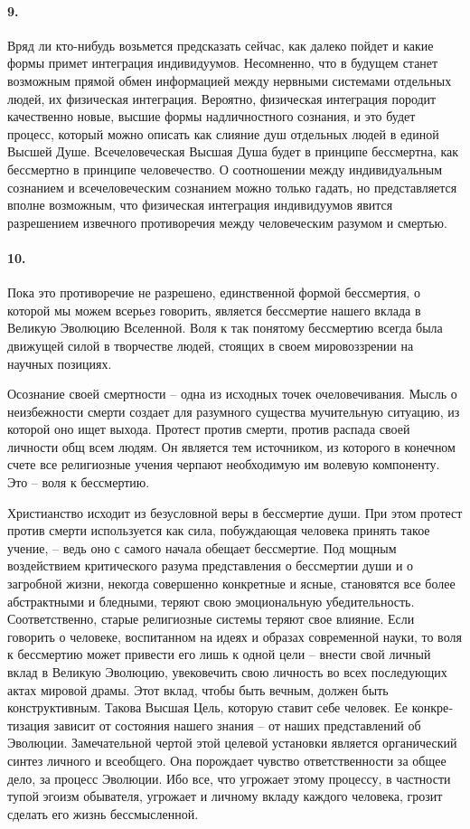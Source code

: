 \documentclass{book}
\begin{document}
\paragraph{9.} Вряд ли кто-нибудь возьмется предсказать сейчас, как далеко пойдет и какие формы примет интеграция индивидуумов. Несомненно, что в будущем станет возможным прямой обмен информацией между нервными системами отдельных людей, их физическая интеграция. Вероятно, физическая интеграция породит качественно новые, высшие формы надличностного сознания, и это будет процесс, который можно опи­сать как слияние душ отдельных людей в единой Высшей Душе. Всечеловеческая Высшая Душа будет в принципе бессмертна, как бессмертно в принципе человечество. О соотношении между индивидуальным сознанием и всечеловеческим сознанием можно только гадать, но представляется вполне возможным, что физическая интеграция индивидуумов явится разрешением извечного противоречия между человеческим разумом и смертью.

\paragraph{10.} Пока это противоречие не разрешено, единственной формой бессмертия, о которой мы можем всерьез говорить, является бессмертие нашего вклада в Великую Эволюцию Вселенной. Воля к так понятому бессмертию всегда была движущей силой в творчестве людей, стоящих в своем мировоззрении на научных позициях.

Осознание своей смертности -- одна из исходных точек очеловечивания. Мысль о неизбежности смерти создает для разумного существа мучительную ситуацию, из которой оно ищет выхода. Протест против смерти, против распада своей личности общ всем людям. Он является тем источником, из которого в конечном счете все религиозные учения черпают необходимую им волевую компоненту. Это -- воля к бессмертию.

Христианство исходит из безусловной веры в бессмертие души. При этом протест против смерти используется как сила, побуждающая человека принять такое учение, -- ведь оно с самого начала обещает бессмертие. Под мощным воздействием критического разума представления о бессмертии души и о загробной жизни, некогда совершенно конкретные и ясные, становятся все более абстрактными и бледными, теряют свою эмоциональную убедительность. Соответственно, старые религиозные системы теряют свое влияние. Если говорить о человеке, воспитанном на идеях и образах современной науки, то воля к бессмертию может привести его лишь к одной цели -- внести свой личный вклад в Великую Эволюцию, увековечить свою личность во всех последующих актах мировой драмы. Этот вклад, чтобы быть вечным, должен быть конструктивным. Такова Высшая Цель, которую ставит себе человек. Ее конкре­тизация зависит от состояния нашего знания -- от наших пред­ставлений об Эволюции. Замечательной чертой этой целевой установки является органический синтез личного 
и всеобщего. Она порождает чувство ответственности за общее дело, за процесс Эволюции. Ибо все, что угрожает этому процессу, в частности тупой эгоизм обывателя, угрожает и личному вкладу каждого человека, грозит сделать его жизнь бессмысленной.
\end{document}
